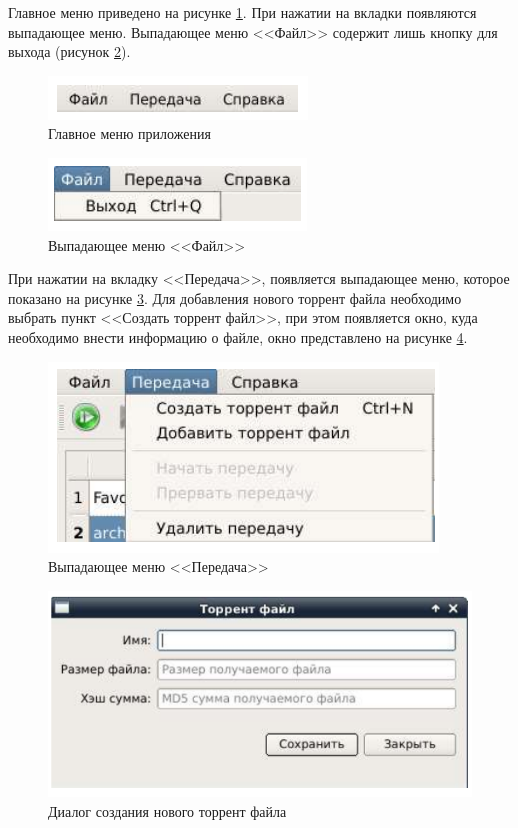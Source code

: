 Главное меню приведено на рисунке \ref{main_menu}. При нажатии на вкладки появляются
выпадающее меню. Выпадающее меню <<Файл>> содержит лишь кнопку для
выхода (рисунок \ref{exit_btn}).

\begin{figure}[!hbt]
    \centering
    \includegraphics{main_menu}
    \caption{Главное меню приложения}\label{main_menu}
\end{figure}
\begin{figure}[!hbt]
    \centering
    \includegraphics{exit_btn}
    \caption{Выпадающее меню <<Файл>>}\label{exit_btn}
\end{figure}

При нажатии на вкладку <<Передача>>, появляется выпадающее меню, которое
показано на рисунке \ref{transmit}. Для добавления нового торрент файла необходимо
выбрать пункт <<Создать торрент файл>>, при этом появляется окно, куда
необходимо внести информацию о файле, окно представлено на рисунке \ref{add_torrent}.

\begin{figure}[!hbt]
    \centering
    \includegraphics{transmit}
    \caption{Выпадающее меню <<Передача>>}\label{transmit}
\end{figure}
\begin{figure}[!hbt]
    \centering
    \includegraphics{add_torrent}
    \caption{Диалог создания нового торрент файла}\label{add_torrent}
\end{figure}

